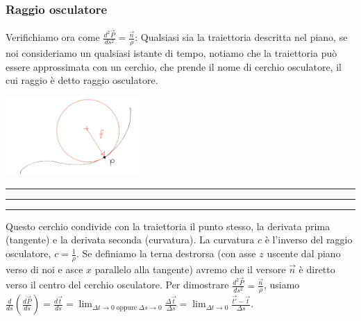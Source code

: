 \subsubsection{Raggio osculatore}
Verifichiamo ora come $\frac{d^2 \vec{P}}{ds^2} = \frac{\vec{n}}{\rho}$:\newline
Qualsiasi sia la traiettoria descritta nel piano, se noi consideriamo un qualsiasi istante di tempo, notiamo che la traiettoria può essere approssimata con un cerchio, che prende il nome di cerchio osculatore, il cui raggio è detto raggio osculatore.
\begin{center}
    \includegraphics[height=3cm]{../lezione1/img3.JPG}
\end{center}
\rule{\textwidth}{0,4pt}\newline
\rule{\textwidth}{0,4pt}\newline
\rule{\textwidth}{0,4pt}\newline
[TIME STAMP = 1:12.10]\newline
Questo cerchio condivide con la traiettoria il punto stesso, la derivata prima (tangente) e la derivata seconda (curvatura). La curvatura $c$ è l'inverso del raggio osculatore, $c = \frac{1}{\rho}$. Se definiamo la terna destrorsa (con asse $z$ uscente dal piano verso di noi e asce $x$ parallelo alla tangente) avremo che il versore $\vec{n}$ è diretto verso il centro del cerchio osculatore.\newline
Per dimostrare $\frac{d^2 \vec{P}}{ds^2} = \frac{\vec{n}}{\rho}$, usiamo $\frac{d}{ds} \left(\frac{d \vec{P}}{ds}\right) = \frac{d \vec{t}}{ds} = \lim_{\Delta t\rightarrow 0 \;\text{oppure}\;\Delta s \rightarrow 0} \frac{\Delta \vec{t}}{\Delta s} = \lim_{\Delta t\rightarrow 0} \frac{\vec{t'}- \vec{t}}{\Delta s}$.\newline
